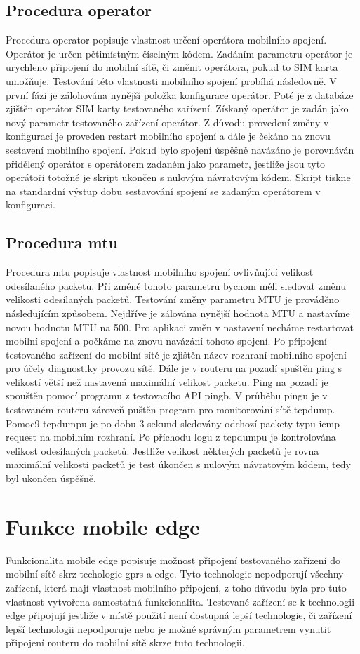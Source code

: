 \subsection{Procedura operator}
Procedura operator popisuje vlastnost určení operátora mobilního spojení. Operátor je určen pětimístným číselným kódem. Zadáním parametru operátor je urychleno připojení do mobilní sítě, či změnit operátora, pokud to SIM karta umožňuje. Testování této vlastnosti mobilního spojení probíhá následovně. V první fázi je zálohována nynější položka konfigurace operátor. Poté je z databáze zjištěn operátor SIM karty testovaného zařízení. Získaný operátor je zadán jako nový parametr testovaného zařízení operátor. Z důvodu provedení změny v konfiguraci je proveden restart mobilního spojení a dále je čekáno na znovu sestavení mobilního spojení. Pokud bylo spojení úspěšně navázáno je porovnáván přidělený operátor s operátorem zadaném jako parametr, jestliže jsou tyto operátoři totožné je skript ukončen s nulovým návratovým kódem. Skript tiskne na standardní výstup dobu sestavování spojení se zadaným operátorem v konfiguraci.

\subsection{Procedura mtu}
Procedura mtu popisuje vlastnost mobilního spojení ovlivňující velikost odesílaného packetu. Při změně tohoto parametru bychom měli sledovat změnu velikosti odesílaných packetů. Testování změny parametru MTU je prováděno následujícím způsobem. Nejdříve je zálována nynější hodnota MTU a nastavíme novou hodnotu MTU na 500. Pro aplikaci změn v nastavení necháme restartovat mobilní spojení a počkáme na znovu navázání tohoto spojení. Po připojení testovaného zařízení do mobilní sítě je zjištěn název rozhraní mobilního spojení pro účely diagnostiky provozu sítě. Dále je v routeru na pozadí spuštěn ping s velikostí větší než nastavená maximální velikost packetu. Ping na pozadí je spouštěn pomocí programu z testovacího API pingb. V průběhu pingu je v testovaném routeru zároveň puštěn program pro monitorování sítě tcpdump. Pomoc9 tcpdumpu je po dobu 3 sekund sledovány odchozí packety typu icmp request na mobilním rozhraní. Po příchodu logu z tcpdumpu je kontrolována velikost odesílaných packetů. Jestliže velikost některých packetů je rovna maximální velikosti packetů je test úkončen s nulovým návratovým kódem, tedy byl ukončen úspěšně.

\section{Funkce mobile edge}
Funkcionalita mobile edge popisuje možnost připojení testovaného zařízení do mobilní sítě skrz techologie gprs a edge. Tyto technologie nepodporují všechny zařízení, která mají vlastnost mobilního připojení, z toho důvodu byla pro tuto vlastnost vytvořena samostatná funkcionalita. Testované zařízení se k technologii edge připojují jestliže v místě použití není dostupná lepší technologie, či zařízení lepší technologii nepodporuje nebo je možné správným parametrem vynutit připojení routeru do mobilní sítě skrze tuto technologii.

